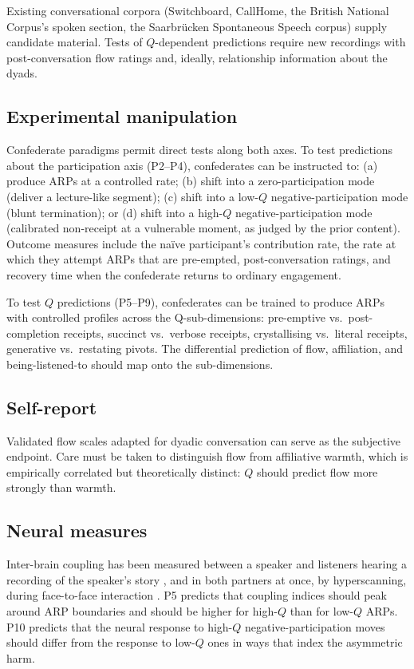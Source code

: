Existing conversational corpora (Switchboard, CallHome, the British National Corpus's spoken section, the Saarbrücken Spontaneous Speech corpus) supply candidate material. Tests of $Q$-dependent predictions require new recordings with post-conversation flow ratings and, ideally, relationship information about the dyads.

\subsection{Experimental manipulation}

Confederate paradigms permit direct tests along both axes. To test predictions about the participation axis (P2--P4), confederates can be instructed to: (a) produce ARPs at a controlled rate; (b) shift into a zero-participation mode (deliver a lecture-like segment); (c) shift into a low-$Q$ negative-participation mode (blunt termination); or (d) shift into a high-$Q$ negative-participation mode (calibrated non-receipt at a vulnerable moment, as judged by the prior content). Outcome measures include the naïve participant's contribution rate, the rate at which they attempt ARPs that are pre-empted, post-conversation ratings, and recovery time when the confederate returns to ordinary engagement.

To test $Q$ predictions (P5--P9), confederates can be trained to produce ARPs with controlled profiles across the Q-sub-dimensions: pre-emptive vs.\ post-completion receipts, succinct vs.\ verbose receipts, crystallising vs.\ literal receipts, generative vs.\ restating pivots. The differential prediction of flow, affiliation, and being-listened-to should map onto the sub-dimensions.

\subsection{Self-report}

Validated flow scales \citep{JacksonMarsh1996} adapted for dyadic conversation can serve as the subjective endpoint. Care must be taken to distinguish flow from affiliative warmth, which is empirically correlated but theoretically distinct: $Q$ should predict flow more strongly than warmth.

\subsection{Neural measures}

Inter-brain coupling has been measured between a speaker and listeners hearing a recording of the speaker's story \citep{Stephens2010}, and in both partners at once, by hyperscanning, during face-to-face interaction \citep{Liu2016}. P5 predicts that coupling indices should peak around ARP boundaries and should be higher for high-$Q$ than for low-$Q$ ARPs. P10 predicts that the neural response to high-$Q$ negative-participation moves should differ from the response to low-$Q$ ones in ways that index the asymmetric harm.

